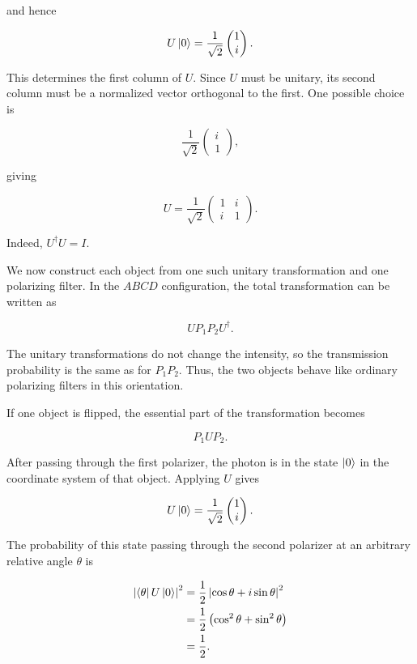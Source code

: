 \documentclass[11pt,a4paper]{article}
\begin{document}
and hence

$$
    U\ket{0}
    =
    \frac{1}{\sqrt{2}}
    \begin{pmatrix}
        1\\
        i
    \end{pmatrix}.
$$

This determines the first column of $U$. Since $U$ must be unitary, its second column must be a normalized vector orthogonal to the first. One possible choice is

$$
    \frac{1}{\sqrt{2}}
    \begin{pmatrix}
        i\\
        1
    \end{pmatrix},
$$

giving

$$
    {
    U=
    \frac{1}{\sqrt{2}}
    \begin{pmatrix}
        1&i\\
        i&1
    \end{pmatrix}
    }.
$$

Indeed, $U^\dagger U=I$.

We now construct each object from one such unitary transformation and one polarizing filter. In the $ABCD$ configuration, the total transformation can be written as

$$
    U P_1 P_2 U^\dagger.
$$

The unitary transformations do not change the intensity, so the transmission probability is the same as for $P_1P_2$. Thus, the two objects behave like ordinary polarizing filters in this orientation.

If one object is flipped, the essential part of the transformation becomes

$$
    P_1 U P_2.
$$

After passing through the first polarizer, the photon is in the state $\ket{0}$ in the coordinate system of that object. Applying $U$ gives

$$
    U\ket{0}
    =
    \frac{1}{\sqrt{2}}
    \begin{pmatrix}
        1\\
        i
    \end{pmatrix}.
$$

The probability of this state passing through the second polarizer at an arbitrary relative angle $\theta$ is

$$
\begin{aligned}
    \left|\bra{\theta}U\ket{0}\right|^2
    &=
    \frac{1}{2}
    \left|\cos\theta+i\sin\theta\right|^2\\
    &=
    \frac{1}{2}
    \left(\cos^2\theta+\sin^2\theta\right)\\
    &=
    \frac{1}{2}.
\end{aligned}
$$
\end{document}
